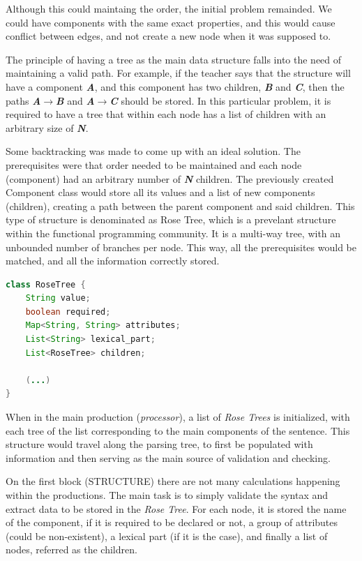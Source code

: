 Although this could maintaing the order, the initial problem remainded. We could have components with the same exact properties, and this would cause conflict between
edges, and not create a new node when it was supposed to.

The principle of having a tree as the main data structure falls into the need of maintaining a valid path. For example, if the teacher says that the structure will have a component \emph{\textbf{A}}, and this component has two children, \emph{\textbf{B}} and \emph{\textbf{C}}, then the paths \emph{\textbf{A$\rightarrow$B}} and \emph{\textbf{A$\rightarrow$C}} should be stored. In this particular problem, it is required to have a tree that within each node has a list of children with an arbitrary size of \emph{\textbf{N}}.

Some backtracking was made to come up with an ideal solution. The prerequisites were that order needed to be maintained and each node (component) had an arbitrary number
of \emph{\textbf{N}} children. The previously created Component class would store all its values and a list of new components (children), creating a path between 
the parent component and said children. This type of structure is denominated as Rose Tree, which is a prevelant structure within the functional programming community. 
It is a multi-way tree, with an unbounded number of branches per node. This way, all the prerequisites would be matched, and all the information correctly stored. 

\begin{center}
\begin{minipage}{9cm}
\begin{lstlisting}[language=java, basicstyle=\small, label={lst:rosetree_class}, caption=RoseTree class]
class RoseTree {
    String value;
    boolean required;
    Map<String, String> attributes;
    List<String> lexical_part;
    List<RoseTree> children;

    (...)
}
\end{lstlisting}
\end{minipage}
\end{center}

When in the main production (\emph{processor}), a list of \emph{Rose Trees} is initialized, with each tree of the list corresponding to the main components of the sentence. This structure would travel along the parsing tree, to first be populated with information and then serving as the main source of validation and checking.

On the first block (STRUCTURE) there are not many calculations happening within the productions. 
The main task is to simply validate the syntax and extract data to be stored in the \emph{Rose Tree}. 
For each node, it is stored the name of the component, if it is required to be declared or not, a group of attributes (could be non-existent), 
a lexical part (if it is the case), and finally a list of nodes, referred as the children.

